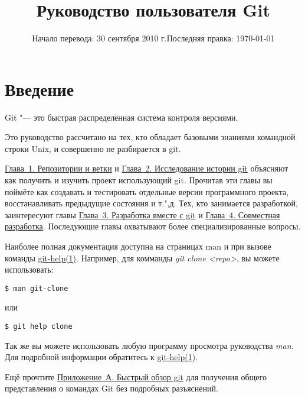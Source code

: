 \documentclass[a4paper, 12pt]{report}
\title{Руководство пользователя Git}
\date{Начало перевода: 30 сентября 2010 г.\linebreak Последняя правка: \today}
\begin{document}
\lstset{language=bash,
		frame=trbl,
		frameround=tttt,
		basicstyle=\ttfamily\small ,
		keywordstyle=\textbf ,
		commentstyle=\textit
		}

\maketitle
\tableofcontents


%
%
\newpage
\chapter*{Введение}
\hypertarget{#preface}{}

Git "--- это быстрая распределённая система контроля версиями.

Это руководство рассчитано на тех, кто обладает базовыми знаниями командной
строки Unix, и совершенно не разбирается в git.

\href{#chapter1}{Глава~1. Репозитории и ветки} и 
\href{#chapter2}{Глава~2. Исследование истории git} объясняют как 
получить и изучить проект использующий git. Прочитав эти главы вы поймёте как 
создавать и тестировать отдельные версии программного проекта, восстанавливать 
предыдущие состояния и т.",д. Тех, кто занимается разработкой, заинтересуют главы
\href{#chapter3}{Глава~3. Разработка вместе с git} и 
\href{#chapter4}{Глава~4. Совместная разработка}. Последующие главы 
охватывают более специализированные вопросы.

Наиболее полная документация доступна на страницах \textsf{man} и при вызове
команды \href{http://www.kernel.org/pub/software/scm/git/docs/git-help.html}
{git-help(1)}. Например, для комманды \emph{git clone <repo>}, вы 
можете использовать:

\begin{lstlisting}
$ man git-clone
\end{lstlisting}

или

\begin{lstlisting}
$ git help clone
\end{lstlisting}

Так же вы можете использовать любую программу просмотра руководства
\emph{man}.
Для подробной информации обратитесь к 
\href{http://www.kernel.org/pub/software/scm/git/docs/git-help.html}
{git-help(1)}.

Ещё прочтите \href{#appendixa}{Приложение~А. Быстрый обзор git} для получения
общего представления о командах Git без подробных разъяснений.
\end{document}
